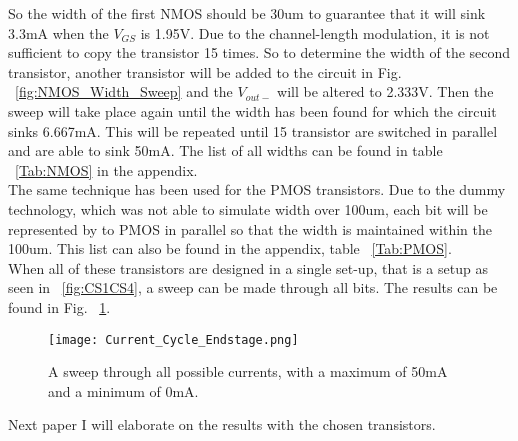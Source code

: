 So the width of the first NMOS should be 30um to guarantee that it will sink 3.3mA when the $V_{GS}$ is 1.95V. Due to the channel-length modulation, it is not sufficient to copy the transistor 15 times. So to determine the width of the second transistor, another transistor will be added to the circuit in Fig. ~\ref{fig:NMOS_Width_Sweep} and the $V_{out-}$ will be altered to 2.333V. Then the sweep will take place again until the width has been found for which the circuit sinks 6.667mA. This will be repeated until 15 transistor are switched in parallel and are able to sink 50mA. The list of all widths can be found in table ~\ref{Tab:NMOS} in the appendix.\\
The same technique has been used for the PMOS transistors. Due to the dummy technology, which was not able to simulate width over 100um, each bit will be represented by to PMOS in parallel so that the width is maintained within the 100um. This list can also be found in the appendix, table ~\ref{Tab:PMOS}.\\

When all of these transistors are designed in a single set-up, that is a setup as seen in ~\ref{fig:CS1CS4}, a sweep can be made through all bits. The results can be found in Fig. ~\ref{fig:Final_result}.
\begin{figure}[ht!]
\begin{center}
\texttt{[image: Current\_Cycle\_Endstage.png]}
\caption{A sweep through all possible currents, with a maximum of 50mA and a minimum of 0mA.}
\label{fig:Final_result}
\end{center}
\end{figure}

Next paper I will elaborate on the results with the chosen transistors. 
